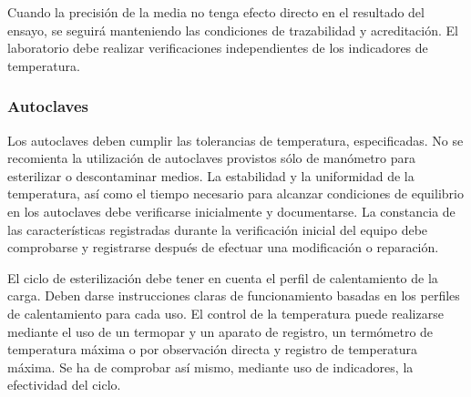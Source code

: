 Cuando la precisión de la media no tenga efecto directo en el resultado del ensayo, se seguirá manteniendo las condiciones de trazabilidad y acreditación. El laboratorio debe realizar verificaciones independientes de los indicadores de temperatura.
\subsubsection{Autoclaves}
Los autoclaves deben cumplir las tolerancias de temperatura, especificadas. No se recomienta la utilización de autoclaves provistos sólo de manómetro para esterilizar o descontaminar medios. La estabilidad y la uniformidad de la temperatura, así como el tiempo necesario para alcanzar condiciones de equilibrio en los autoclaves debe verificarse inicialmente y documentarse. La constancia de las características registradas durante la verificación inicial del equipo debe comprobarse y registrarse después de efectuar una modificación o reparación.

El ciclo de esterilización debe tener en cuenta el perfil de calentamiento de la carga. Deben darse instrucciones claras de funcionamiento basadas en los perfiles de calentamiento para cada uso. El control de la temperatura puede realizarse mediante el uso de un termopar y un aparato de registro, un termómetro de temperatura máxima o por observación directa y registro de temperatura máxima. Se ha de comprobar así mismo, mediante uso de indicadores, la efectividad del ciclo.


